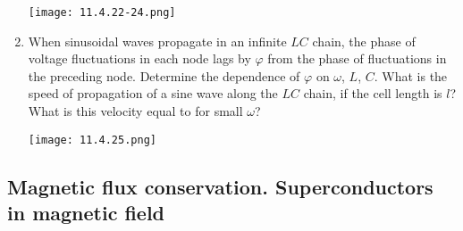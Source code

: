 \documentclass{article}
\begin{document}
\begin{enumerate}[label=11.4.\arabic*]
\begin{center}
    \texttt{[image: 11.4.22-24.png]}
\end{center}

\item When sinusoidal waves propagate in an infinite $LC$ chain, the phase of voltage fluctuations in each node lags by $\varphi$ from the phase of fluctuations in the preceding node. Determine the dependence of $\varphi$ on $\omega$, $L$, $C$. What is the speed of propagation of a sine wave along the $LC$ chain, if the cell length is $l$? What is this velocity equal to for small $\omega$?

\begin{center}
    \texttt{[image: 11.4.25.png]}
\end{center}

\end{enumerate}


\subsection{Magnetic flux conservation. Superconductors in magnetic field}
\end{document}
